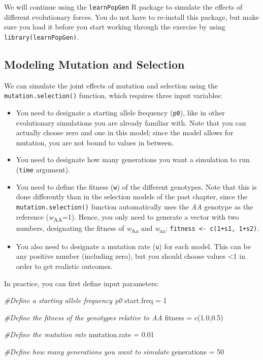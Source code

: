 \documentclass[
]{book}
\newenvironment{Shaded}{\begin{snugshade}}{\end{snugshade}}
\newcommand{\CommentTok}[1]{\textcolor[rgb]{0.56,0.35,0.01}{\textit{#1}}}
\newcommand{\DecValTok}[1]{\textcolor[rgb]{0.00,0.00,0.81}{#1}}
\newcommand{\FloatTok}[1]{\textcolor[rgb]{0.00,0.00,0.81}{#1}}
\newcommand{\FunctionTok}[1]{\textcolor[rgb]{0.00,0.00,0.00}{#1}}
\newcommand{\NormalTok}[1]{#1}
\newcommand{\OtherTok}[1]{\textcolor[rgb]{0.56,0.35,0.01}{#1}}
\begin{document}
We will continue using the \texttt{learnPopGen} R package to simulate the effects of different evolutionary forces. You do not have to re-install this package, but make sure you load it before you start working through the exercise by using \texttt{library(learnPopGen)}.

\hypertarget{modeling-mutation-and-selection}{%
\subsection{Modeling Mutation and Selection}\label{modeling-mutation-and-selection}}

We can simulate the joint effects of mutation and selection using the \texttt{mutation.selection()} function, which requires three input variables:

\begin{itemize}
\item
  You need to designate a starting allele frequency (\texttt{p0}), like in other evolutionary simulations you are already familiar with. Note that you can actually choose zero and one in this model; since the model allows for mutation, you are not bound to values in between.
\item
  You need to designate how many generations you want a simulation to run (\texttt{time} argument).
\item
  You need to define the fitness (\texttt{w}) of the different genotypes. Note that this is done differently than in the selection models of the past chapter, since the \texttt{mutation.selection()} function automatically uses the \emph{AA} genotype as the reference (\emph{w}\textsubscript{AA}=1). Hence, you only need to generate a vector with two numbers, designating the fitness of \emph{w}\textsubscript{Aa} and \emph{w}\textsubscript{aa}: \texttt{fitness\ \textless{}-\ c(1+s1,\ 1+s2)}.
\item
  You also need to designate a mutation rate (\texttt{u}) for each model. This can be any positive number (including zero), but you should choose values \textless1 in order to get realistic outcomes.
\end{itemize}

In practice, you can first define input parameters:

\begin{Shaded}
\begin{Highlighting}[]
\CommentTok{\#Define a starting allele frequency p0}
\NormalTok{start.freq }\OtherTok{=} \DecValTok{1}

\CommentTok{\#Define the fitness of the genotypes relative to AA}
\NormalTok{fitness }\OtherTok{=} \FunctionTok{c}\NormalTok{(}\FloatTok{1.0}\NormalTok{,}\FloatTok{0.5}\NormalTok{)}

\CommentTok{\#Define the mutation rate}
\NormalTok{mutation.rate }\OtherTok{=} \FloatTok{0.01}

\CommentTok{\#Define how many generations you want to simulate}
\NormalTok{generations }\OtherTok{=} \DecValTok{50}
\end{Highlighting}
\end{Shaded}
\end{document}
